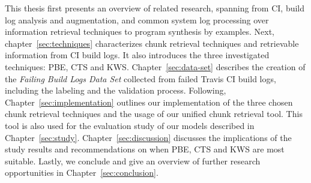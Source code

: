 \documentclass[\myrootdir/main.tex]{subfiles}
\begin{document}
This thesis first presents an overview of related research, spanning from CI, build log analysis and augmentation, and common system log processing over information retrieval techniques to program synthesis by examples.
Next, chapter~\ref{sec:techniques} characterizes chunk retrieval techniques and retrievable information from CI build logs.
It also introduces the three investigated techniques: PBE, CTS and KWS\@.
Chapter~\ref{sec:data-set} describes the creation of the \emph{Failing Build Logs Data Set} collected from failed Travis CI build logs, including the labeling and the validation process.
Following, Chapter~\ref{sec:implementation} outlines our implementation of the three chosen chunk retrieval techniques and the usage of our unified chunk retrieval tool.
This tool is also used for the evaluation study of our models described in Chapter~\ref{sec:study}.
Chapter~\ref{sec:discussion} discusses the implications of the study results and recommendations on when PBE, CTS and KWS are most suitable.
Lastly, we conclude and give an overview of further research opportunities in Chapter~\ref{sec:conclusion}.
\end{document}
